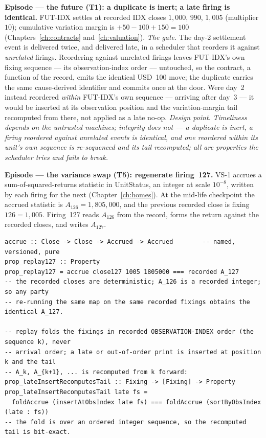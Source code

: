 \documentclass[11pt,a4paper]{article}
\newcommand{\USD}[1]{\mbox{USD~#1}}
\begin{document}
\medskip\noindent\textbf{Episode --- the future (T1): a duplicate is inert; a late firing is
identical.}
FUT-IDX settles at recorded IDX closes $1{,}000$, $990$, $1{,}005$ (multiplier $10$);
cumulative variation margin is $+50-100+150 = 100$ (Chapters~\ref{ch:contracts}
and~\ref{ch:valuation}). \emph{The gate.} The day-2 settlement event is delivered twice, and
delivered late, in a scheduler that reorders it against \emph{unrelated} firings. Reordering
against unrelated firings leaves FUT-IDX's own fixing sequence --- its observation-index
order --- untouched, so the contract, a function of the record, emits the identical
\USD{100} move; the duplicate carries the same cause-derived identifier and commits once at
the door. Were day~2 instead reordered \emph{within} FUT-IDX's own sequence --- arriving
after day~3 --- it would be inserted at its observation position and the variation-margin
tail recomputed from there, not applied as a late no-op. \emph{Design point.}
\emph{Timeliness depends on the untrusted machines; integrity does not --- a duplicate is
inert, a firing reordered against unrelated events is identical, and one reordered within
its unit's own sequence is re-sequenced and its tail recomputed; all are properties the
scheduler tries and fails to break.}

\medskip\noindent\textbf{Episode --- the variance swap (T5): regenerate firing~127.}
VS-1 accrues a sum-of-squared-returns statistic in UnitStatus, an integer at scale $10^{-8}$,
written by each firing for the next (Chapter~\ref{ch:homes}). At the mid-life checkpoint the
accrued statistic is $A_{126} = 1{,}805{,}000$, and the previous recorded close is fixing
$126 = 1{,}005$. Firing~127 reads $A_{126}$ from the record, forms the return against the
recorded closes, and writes $A_{127}$.

\begin{lstlisting}
accrue :: Close -> Close -> Accrued -> Accrued        -- named, versioned, pure
prop_replay127 :: Property
prop_replay127 = accrue close127 1005 1805000 === recorded A_127
-- the recorded closes are deterministic; A_126 is a recorded integer; so any party
-- re-running the same map on the same recorded fixings obtains the identical A_127.

-- replay folds the fixings in recorded OBSERVATION-INDEX order (the sequence k), never
-- arrival order; a late or out-of-order print is inserted at position k and the tail
-- A_k, A_{k+1}, ... is recomputed from k forward:
prop_lateInsertRecomputesTail :: Fixing -> [Fixing] -> Property
prop_lateInsertRecomputesTail late fs =
  foldAccrue (insertAtObsIndex late fs) === foldAccrue (sortByObsIndex (late : fs))
-- the fold is over an ordered integer sequence, so the recomputed tail is bit-exact.
\end{lstlisting}
\end{document}
